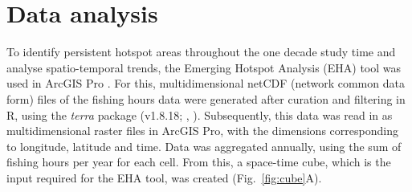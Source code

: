 \section{Data analysis}
To identify persistent hotspot areas throughout the one decade study time and analyse spatio-temporal trends, the Emerging Hotspot Analysis (EHA) tool
was used in ArcGIS Pro \citep{arcgis}. For this, multidimensional netCDF (network common data form) files of the fishing hours data were generated after curation and filtering in R, using
the \textit{terra} package (v1.8.18; \citeauthor{terra_package}, \citeyear{terra_package}). Subsequently, this data was read in as multidimensional raster files in ArcGIS Pro, with the
dimensions corresponding to longitude, latitude and time. Data was aggregated annually, using the sum of fishing hours per year for each cell.
From this, a space-time cube, which is the input required for the EHA tool, was created (Fig.~\ref{fig:cube}A).


